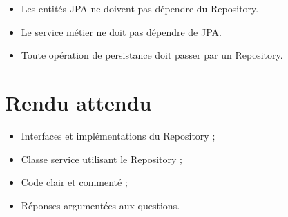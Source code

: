\documentclass[11pt]{article}
\begin{document}
\begin{itemize}
    \item Les entités JPA ne doivent pas dépendre du Repository.
    \item Le service métier ne doit pas dépendre de JPA.
    \item Toute opération de persistance doit passer par un Repository.
\end{itemize}

\bigskip

\section*{Rendu attendu}

\begin{itemize}
    \item Interfaces et implémentations du Repository ;
    \item Classe service utilisant le Repository ;
    \item Code clair et commenté ;
    \item Réponses argumentées aux questions.
\end{itemize}
\end{document}
